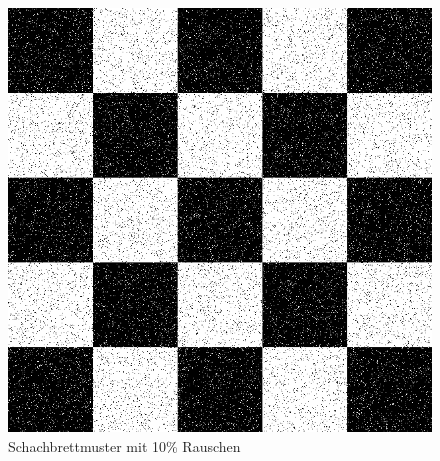 \begin{figure}[hbt]
	\centering
	\includegraphics[width=0.7\linewidth]{./Bilder/Auswertung/BeispielBilder/Picture_Example1_noise_10_pixelCnt_128_featureCnt_5}
	\caption{Schachbrettmuster mit 10\% Rauschen}
\end{figure}